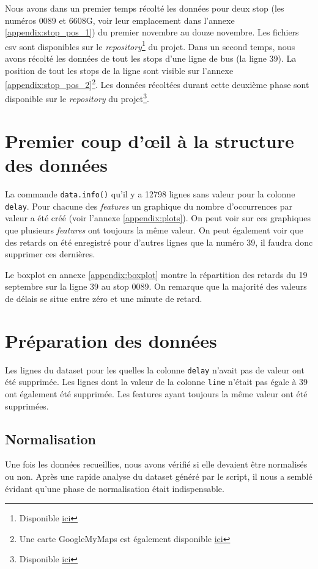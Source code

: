 \documentclass[12pt]{report}
\begin{document}
Nous avons dans un premier temps récolté les données pour deux stop (les numéros 0089 et 6608G, voir leur emplacement dans l'annexe \ref{appendix:stop_pos_1}) du premier novembre au douze novembre. Les fichiers csv sont disponibles sur le \textit{repository}\footnote{Disponible \href{https://github.com/jalbrecq/CanYouCatchIt/tree/main/sandbox/data/csv}{ici}} du projet. Dans un second temps, nous avons récolté les données de tout les stops d'une ligne de bus (la ligne 39). La position de tout les stops de la ligne sont visible sur l'annexe \ref{appendix:stop_pos_2}\footnote{Une carte GoogleMyMaps est également disponible \href{https://www.google.com/maps/d/edit?mid=1_qNGPUfuZXrqC3UZXkmDOWuhEHJfYAox&usp=sharing}{ici}}. Les données récoltées durant cette deuxième phase sont disponible sur le \textit{repository} du projet\footnote{Disponible \href{https://github.com/jalbrecq/CanYouCatchIt/tree/main/sandbox/data/csv2}{ici}}.

\section{Premier coup d'œil à la structure des données}
La commande \lstinline!data.info()! qu'il y a 12798 lignes sans valeur pour la colonne \lstinline!delay!. Pour chacune des \textit{features} un graphique du nombre d'occurrences par valeur a été créé (voir l'annexe \ref{appendix:plots}). On peut voir sur ces graphiques que plusieurs \textit{features} ont toujours la même valeur. On peut également voir que des retards on été enregistré pour d'autres lignes que la numéro 39, il faudra donc supprimer ces dernières.

Le boxplot en annexe \ref{appendix:boxplot} montre la répartition des retards du 19 septembre sur la ligne 39 au stop 0089. On remarque que la majorité des valeurs de délais se situe entre zéro et une minute de retard.

\section{Préparation des données}

Les lignes du dataset pour les quelles la colonne \lstinline!delay! n'avait pas de valeur ont été supprimée. Les lignes dont la valeur de la colonne \lstinline!line! n'était pas égale à 39 ont également été supprimée. Les features ayant toujours la même valeur ont été supprimées.

\subsection{Normalisation}
Une fois les données recueillies, nous avons vérifié si elle devaient être normalisés ou non. Après une rapide analyse du dataset généré par le script, il nous a semblé évidant qu'une phase de normalisation était indispensable.
\end{document}
